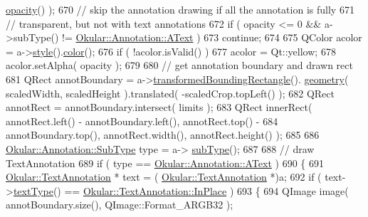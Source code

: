 \begin{DoxyCode}
      \hyperlink{classOkular_1_1Annotation_1_1Style_abb17b057d91f128793b3fa3d4b556a45}{opacity}() );
670             \textcolor{comment}{// skip the annotation drawing if all the annotation is fully}
671             \textcolor{comment}{// transparent, but not with text annotations}
672             \textcolor{keywordflow}{if} ( opacity <= 0 && a->subType() != \hyperlink{classOkular_1_1Annotation_af71b46e37d5f850b97d5c4de3be9aac0a48f93d5a9352abc4e38a45f69075e504}{Okular::Annotation::AText} )
673                 \textcolor{keywordflow}{continue};
674 
675             QColor acolor = a->\hyperlink{classOkular_1_1Annotation_ae1f845ddbd6d524b2b388c6c9ef26423}{style}().\hyperlink{classOkular_1_1Annotation_1_1Style_a2c32cb2b41ef8732ddcd3d3dffc20b7d}{color}();
676             \textcolor{keywordflow}{if} ( !acolor.isValid() )
677                 acolor = Qt::yellow;
678             acolor.setAlpha( opacity );
679 
680             \textcolor{comment}{// get annotation boundary and drawn rect}
681             QRect annotBoundary = a->\hyperlink{classOkular_1_1Annotation_a950ea9c7993878729eb4b6b0ea922436}{transformedBoundingRectangle}().
      \hyperlink{classOkular_1_1NormalizedRect_a006897c5fcff2c3a97b4141f1a967513}{geometry}( scaledWidth, scaledHeight ).translated( -scaledCrop.topLeft() );
682             QRect annotRect = annotBoundary.intersect( limits );
683             QRect innerRect( annotRect.left() - annotBoundary.left(), annotRect.top() -
684                     annotBoundary.top(), annotRect.width(), annotRect.height() );
685 
686             \hyperlink{classOkular_1_1Annotation_af71b46e37d5f850b97d5c4de3be9aac0}{Okular::Annotation::SubType} type = a->
      \hyperlink{classOkular_1_1Annotation_af9833449767eacd740f377e69a1fdd48}{subType}();
687 
688             \textcolor{comment}{// draw TextAnnotation}
689             \textcolor{keywordflow}{if} ( type == \hyperlink{classOkular_1_1Annotation_af71b46e37d5f850b97d5c4de3be9aac0a48f93d5a9352abc4e38a45f69075e504}{Okular::Annotation::AText} )
690             \{
691                 \hyperlink{classOkular_1_1TextAnnotation}{Okular::TextAnnotation} * text = (
      \hyperlink{classOkular_1_1TextAnnotation}{Okular::TextAnnotation} *)a;
692                 \textcolor{keywordflow}{if} ( text->\hyperlink{classOkular_1_1TextAnnotation_acf75a9a22542d3008a486298972e6dcf}{textType}() == \hyperlink{classOkular_1_1TextAnnotation_af560204454bf812797bc95bea730b06ea2a746e9125e8cf53627335a8af01b998}{Okular::TextAnnotation::InPlace}
       )
693                 \{
694                     QImage image( annotBoundary.size(), QImage::Format\_ARGB32 );

\end{DoxyCode}

